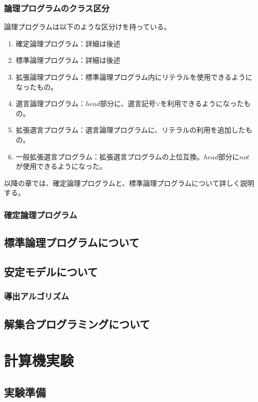 \documentclass[dvipdfmx]{jsarticle}
\begin{document}
  \subsubsection{論理プログラムのクラス区分}
  論理プログラムは以下のような区分けを持っている。
  \begin{enumerate}
    \item 確定論理プログラム：詳細は後述
    \item 標準論理プログラム：詳細は後述
    \item 拡張論理プログラム：標準論理プログラム内にリテラルを使用できるようになったもの。
    \item 選言論理プログラム：$head$部分に、選言記号$\vee$を利用できるようになったもの。
    \item 拡張選言プログラム：選言論理プログラムに、リテラルの利用を追加したもの。
    \item 一般拡張選言プログラム：拡張選言プログラムの上位互換。$head$部分に$not$が使用できるようになった。
  \end{enumerate}
  以降の章では、確定論理プログラムと、標準論理プログラムについて詳しく説明する。
  \subsubsection{確定論理プログラム}
  
\subsection{標準論理プログラムについて}
\subsection{安定モデルについて}
  \subsubsection{導出アルゴリズム}
\subsection{解集合プログラミングについて}

\section{計算機実験}
\subsection{実験準備}
\end{document}
